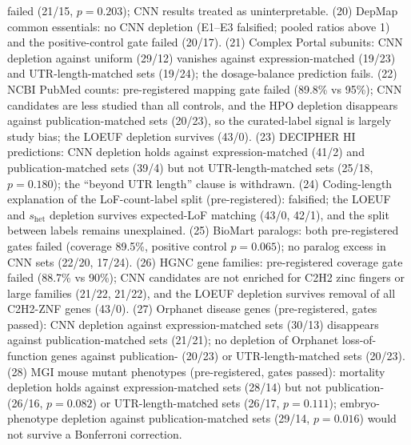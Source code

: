 \documentclass[11pt]{article}
\begin{document}
failed (21/15, $p=0.203$); CNN results treated as uninterpretable. (20) DepMap common essentials: no CNN depletion (E1--E3 falsified; pooled ratios above 1) and the positive-control gate failed (20/17). (21) Complex Portal subunits: CNN depletion against uniform (29/12) vanishes against expression-matched (19/23) and UTR-length-matched sets (19/24); the dosage-balance prediction fails. (22) NCBI PubMed counts: pre-registered mapping gate failed (89.8\% vs 95\%); CNN candidates are less studied than all controls, and the HPO depletion disappears against publication-matched sets (20/23), so the curated-label signal is largely study bias; the LOEUF depletion survives (43/0). (23) DECIPHER HI predictions: CNN depletion holds against expression-matched (41/2) and publication-matched sets (39/4) but not UTR-length-matched sets (25/18, $p=0.180$); the ``beyond UTR length'' clause is withdrawn. (24) Coding-length explanation of the LoF-count-label split (pre-registered): falsified; the LOEUF and $s_\mathrm{het}$ depletion survives expected-LoF matching (43/0, 42/1), and the split between labels remains unexplained. (25) BioMart paralogs: both pre-registered gates failed (coverage 89.5\%, positive control $p=0.065$); no paralog excess in CNN sets (22/20, 17/24). (26) HGNC gene families: pre-registered coverage gate failed (88.7\% vs 90\%); CNN candidates are not enriched for C2H2 zinc fingers or large families (21/22, 21/22), and the LOEUF depletion survives removal of all C2H2-ZNF genes (43/0). (27) Orphanet disease genes (pre-registered, gates passed): CNN depletion against expression-matched sets (30/13) disappears against publication-matched sets (21/21); no depletion of Orphanet loss-of-function genes against publication- (20/23) or UTR-length-matched sets (20/23). (28) MGI mouse mutant phenotypes (pre-registered, gates passed): mortality depletion holds against expression-matched sets (28/14) but not publication- (26/16, $p=0.082$) or UTR-length-matched sets (26/17, $p=0.111$); embryo-phenotype depletion against publication-matched sets (29/14, $p=0.016$) would not survive a Bonferroni correction.
\end{document}
